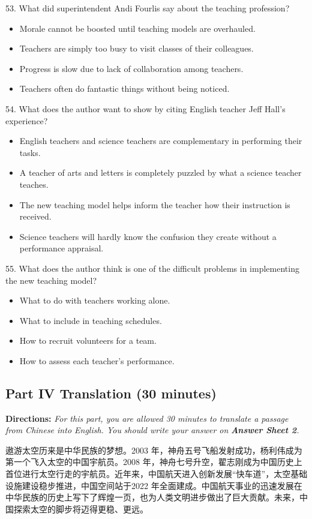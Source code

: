 \documentclass[UTF8,11pt]{ctexart}
\begin{document}
53. What did superintendent Andi Fourlis say about the teaching profession?


\begin{itemize}[leftmargin=2em,itemsep=.2em,topsep=.4em]\item[A.] Morale cannot be boosted until teaching models are overhauled.
\item[B.] Teachers are simply too busy to visit classes of their colleagues.
\item[C.] Progress is slow due to lack of collaboration among teachers.
\item[D.] Teachers often do fantastic things without being noticed.
\end{itemize}

54. What does the author want to show by citing English teacher Jeff Hall’s experience?


\begin{itemize}[leftmargin=2em,itemsep=.2em,topsep=.4em]\item[A.] English teachers and science teachers are complementary in performing their tasks.
\item[B.] A teacher of arts and letters is completely puzzled by what a science teacher teaches.
\item[C.] The new teaching model helps inform the teacher how their instruction is received.
\item[D.] Science teachers will hardly know the confusion they create without a performance appraisal.
\end{itemize}

55. What does the author think is one of the difficult problems in implementing the new teaching model?


\begin{itemize}[leftmargin=2em,itemsep=.2em,topsep=.4em]\item[A.] What to do with teachers working alone.
\item[B.] What to include in teaching schedules.
\item[C.] How to recruit volunteers for a team.
\item[D.] How to assess each teacher’s performance.
\end{itemize}

\subsection*{\textbf{Part IV Translation} \textbf{(30 minutes)}}


\textbf{Directions: }\textit{For this part, you are allowed 30 minutes to translate a passage from Chinese into English. You} \textit{should write your answer on }\textbf{\textit{Answer Sheet 2}}\textit{.}


遨游太空历来是中华民族的梦想。2003 年，神舟五号飞船发射成功，杨利伟成为第一个飞入太空的中国宇航员。2008 年，神舟七号升空，翟志刚成为中国历史上首位进行太空行走的宇航员。近年来，中国航天进入创新发展“快车道”，太空基础设施建设稳步推进，中国空间站于2022 年全面建成。中国航天事业的迅速发展在中华民族的历史上写下了辉煌一页，也为人类文明进步做出了巨大贡献。未来，中国探索太空的脚步将迈得更稳、更远。
\end{document}
